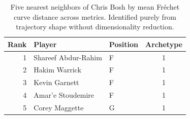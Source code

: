 \begin{table}[htbp]
  \centering\small
  \begin{tabular}{rllc}
    \toprule
    Rank & Player & Position & Archetype \\
    \midrule
    1 & Shareef Abdur-Rahim & F & 1 \\
    2 & Hakim Warrick & F & 1 \\
    3 & Kevin Garnett & F & 1 \\
    4 & Amar'e Stoudemire & F & 1 \\
    5 & Corey Maggette & G & 1 \\
    \bottomrule
  \end{tabular}
  \caption{Five nearest neighbors of Chris Bosh by mean Fr\'{e}chet curve distance across metrics. Identified purely from trajectory shape without dimensionality reduction.}
  \label{tab:Chris_Bosh_frechet_curve_neighbors}
\end{table}

